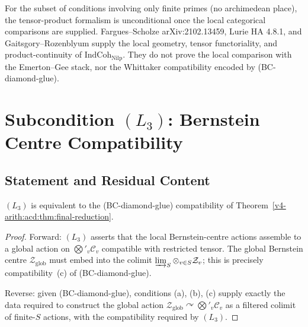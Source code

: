 \begin{remark}
\label{v4-arith:acd:rem:L2-finite-unconditional}
For the subset of conditions involving only finite primes (no
archimedean place), the tensor-product formalism is unconditional
once the local categorical comparisons are supplied. Fargues--Scholze
arXiv:2102.13459, Lurie HA 4.8.1, and Gaitsgory--Rozenblyum supply
the local geometry, tensor functoriality, and product-continuity of
\(\mathrm{IndCoh}_{\mathrm{Nilp}}\). They do not prove the local
comparison with the Emerton--Gee stack, nor the Whittaker
compatibility encoded by (BC-diamond-glue).
\end{remark}

\section{Subcondition \((L_{3})\): Bernstein Centre Compatibility}
\label{v4-arith:acd:L3}

\subsection{Statement and Residual Content}

\begin{theorem}
\label{v4-arith:acd:thm:L3-is-bc-diamond-glue}
\((L_{3})\) is equivalent to the
(BC-diamond-glue) compatibility of
Theorem~\ref{v4-arith:acd:thm:final-reduction}.
\end{theorem}

\begin{proof}
Forward: \((L_{3})\) asserts that the local Bernstein-centre actions
assemble to a global action on \(\bigotimes'_{v}\mathcal{C}_{v}\)
compatible with restricted tensor. The global Bernstein centre
\(\mathcal{Z}_{\mathrm{glob}}\) must embed into the colimit
\(\varinjlim_{S}\otimes_{v\in S}\mathcal{Z}_{v}\); this is precisely
compatibility~(c) of (BC-diamond-glue).

Reverse: given (BC-diamond-glue), conditions (a), (b), (c) supply
exactly the data required to construct the global action
\(\mathcal{Z}_{\mathrm{glob}}\curvearrowright\bigotimes'_{v}\mathcal{C}_{v}\)
as a filtered colimit of finite-\(S\) actions, with the compatibility
required by \((L_{3})\).
\end{proof}


